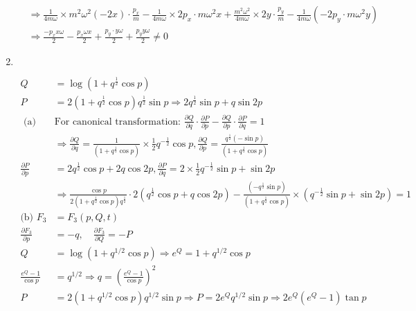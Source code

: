 \begin{enumerate}
\begin{answer}
\begin{align*}
		&\Rightarrow \frac{1}{4 m \omega} \times m^{2} \omega^{2}(-2 x) \cdot \frac{p_{x}}{m}-\frac{1}{4 m \omega} \times 2 p_{x} \cdot m \omega^{2} x+\frac{m^{2} \omega^{2}}{4 m \omega} \times 2 y \cdot \frac{p_{y}}{m}-\frac{1}{4 m \omega}\left(-2 p_{y} \cdot m \omega^{2} y\right) \\
		&\Rightarrow \frac{-p_{x} x \omega}{2}-\frac{p_{x} \omega x}{2}+\frac{p_{y} \cdot y \omega}{2}+\frac{p_{y} y \omega}{2} \neq 0
	\end{align*}
\end{answer}
	\item $\left. \right. $
\begin{answer}
	\begin{align*}
	Q&=\log \left(1+q^{\frac{1}{2}} \cos p\right)\\
	P&=2\left(1+q^{\frac{1}{2}} \cos p\right) q^{\frac{1}{2}} \sin p \Rightarrow 2 q^{\frac{1}{2}} \sin p+q \sin 2 p\\
\text{	(a) }&\text{For canonical transformation: }\frac{\partial Q}{\partial q} \cdot \frac{\partial P}{\partial p}-\frac{\partial Q}{\partial p} \cdot \frac{\partial P}{\partial q}=1\\
	&\Rightarrow \frac{\partial Q}{\partial q}=\frac{1}{\left(1+q^{\frac{1}{2}} \cos p\right)} \times \frac{1}{2} q^{-\frac{1}{2}} \cos p, \frac{\partial Q}{\partial p}=\frac{q^{\frac{1}{2}}(-\sin p)}{\left(1+q^{\frac{1}{2}} \cos p\right)}\\
	\frac{\partial P}{\partial p}&=2 q^{\frac{1}{2}} \cos p+2 q \cos 2 p, \frac{\partial P}{\partial q}=2 \times \frac{1}{2} q^{-\frac{1}{2}} \sin p+\sin 2 p\\
	&\Rightarrow \frac{\cos p}{2\left(1+q^{\frac{1}{2}} \cos p\right) q^{\frac{1}{2}}} \cdot 2\left(q^{\frac{1}{2}} \cos p+q \cos 2 p\right)-\frac{\left(-q^{\frac{1}{2}} \sin p\right)}{\left(1+q^{\frac{1}{2}} \cos p\right)} \times\left(q^{-\frac{1}{2}} \sin p+\sin 2 p\right)=1\\
	\text{(b) }F_{3}&=F_{3}(p, Q, t)\\
	\frac{\partial F_{3}}{\partial p}&=-q, \quad \frac{\partial F_{3}}{\partial Q}=-P \\
	Q&=\log \left(1+q^{1 / 2} \cos p\right) \Rightarrow e^{Q}=1+q^{1 / 2} \cos p\\
	\frac{e^{Q}-1}{\cos p}&=q^{1 / 2} \Rightarrow q=\left(\frac{e^{Q}-1}{\cos p}\right)^{2}\\
	P&=2\left(1+q^{1 / 2} \cos p\right) q^{1 / 2} \sin p \Rightarrow P=2 e^{Q} q^{1 / 2} \sin p \Rightarrow 2 e^{Q}\left(e^{Q}-1\right) \tan p\\

\end{align*}
\end{answer}
\end{enumerate}
